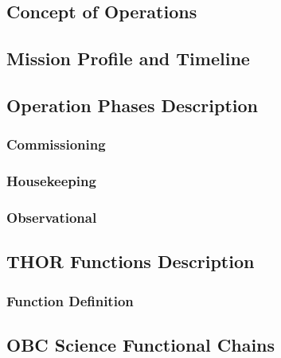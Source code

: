 
\subsection{Concept of Operations}

\subsection{Mission Profile and Timeline}

\subsection{Operation Phases Description}

\subsubsection{Commissioning}

\subsubsection{Housekeeping}

\subsubsection{Observational}

\subsection{THOR Functions Description}

\subsubsection{Function Definition}

\subsection{OBC Science Functional Chains}

